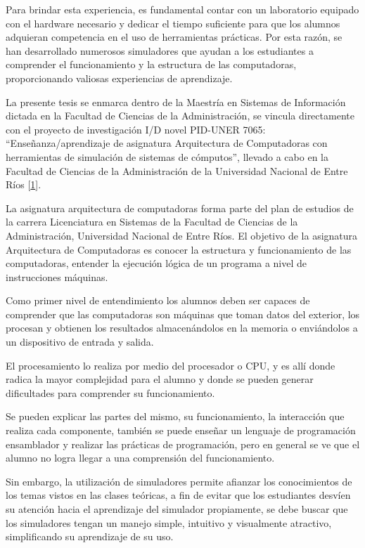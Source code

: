\documentclass[12pt,twoside]{templates/unerthesis}
\begin{document}
Para brindar esta experiencia, es fundamental contar con un laboratorio equipado con el hardware necesario y dedicar el tiempo suficiente para que los alumnos adquieran competencia en el uso de herramientas prácticas. Por esta razón, se han desarrollado numerosos simuladores que ayudan a los estudiantes a comprender el funcionamiento y la estructura de las computadoras, proporcionando valiosas experiencias de aprendizaje.

La presente tesis se enmarca dentro de la Maestría en Sistemas de Información dictada en la Facultad de Ciencias de la Administración, se vincula directamente con el proyecto de investigación I/D novel PID-UNER 7065: ``Enseñanza/aprendizaje de asignatura Arquitectura de Computadoras con herramientas de simulación de sistemas de cómputos'', llevado a cabo en la Facultad de Ciencias de la Administración de la Universidad Nacional de Entre Ríos {[}\protect\hyperlink{ref-colombani_pid_2022}{1}{]}.

La asignatura arquitectura de computadoras forma parte del plan de estudios de la carrera Licenciatura en Sistemas de la Facultad de Ciencias de la Administración, Universidad Nacional de Entre Ríos. El objetivo de la asignatura Arquitectura de Computadoras es conocer la estructura y funcionamiento de las computadoras, entender la ejecución lógica de un programa a nivel de instrucciones máquinas.

Como primer nivel de entendimiento los alumnos deben ser capaces de comprender que las computadoras son máquinas que toman datos del exterior, los procesan y obtienen los resultados almacenándolos en la memoria o enviándolos a un dispositivo de entrada y salida.

El procesamiento lo realiza por medio del procesador o CPU, y es allí donde radica la mayor complejidad para el alumno y donde se pueden generar dificultades para comprender su funcionamiento.

Se pueden explicar las partes del mismo, su funcionamiento, la interacción que realiza cada componente, también se puede enseñar un lenguaje de programación ensamblador y realizar las prácticas de programación, pero en general se ve que el alumno no logra llegar a una comprensión del funcionamiento.

Sin embargo, la utilización de simuladores permite afianzar los conocimientos de los temas vistos en las clases teóricas, a fin de evitar que los estudiantes desvíen su atención hacia el aprendizaje del simulador propiamente, se debe buscar que los simuladores tengan un manejo simple, intuitivo y visualmente atractivo, simplificando su aprendizaje de su uso.
\end{document}
